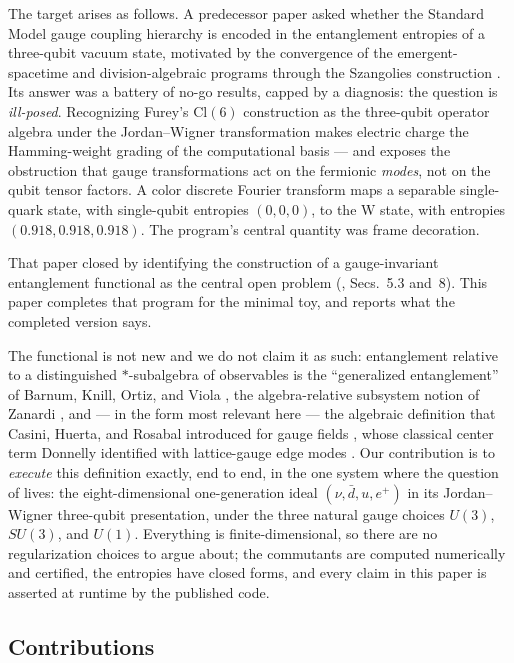 \documentclass[11pt]{article}
\begin{document}
The target arises as follows. A predecessor paper \cite{companion} asked whether the Standard Model gauge coupling hierarchy is encoded in the entanglement entropies of a three-qubit vacuum state, motivated by the convergence of the emergent-spacetime and division-algebraic programs through the Szangolies construction \cite{szangolies}. Its answer was a battery of no-go results, capped by a diagnosis: the question is \emph{ill-posed}. Recognizing Furey's $\mathrm{Cl}(6)$ construction \cite{furey14, furey18, stoica} as the three-qubit operator algebra under the Jordan--Wigner transformation \cite{jordanwigner} makes electric charge the Hamming-weight grading of the computational basis --- and exposes the obstruction that gauge transformations act on the fermionic \emph{modes}, not on the qubit tensor factors. A color discrete Fourier transform maps a separable single-quark state, with single-qubit entropies $(0, 0, 0)$, to the W state, with entropies $(0.918, 0.918, 0.918)$. The program's central quantity was frame decoration.

That paper closed by identifying the construction of a gauge-invariant entanglement functional as the central open problem (\cite{companion}, Secs.~5.3 and~8). This paper completes that program for the minimal toy, and reports what the completed version says.

The functional is not new and we do not claim it as such: entanglement relative to a distinguished $*$-subalgebra of observables is the ``generalized entanglement'' of Barnum, Knill, Ortiz, and Viola \cite{barnum}, the algebra-relative subsystem notion of Zanardi \cite{zanardi}, and --- in the form most relevant here --- the algebraic definition that Casini, Huerta, and Rosabal introduced for gauge fields \cite{chr}, whose classical center term Donnelly identified with lattice-gauge edge modes \cite{donnelly12, donnelly14}. Our contribution is to \emph{execute} this definition exactly, end to end, in the one system where the question of \cite{companion} lives: the eight-dimensional one-generation ideal $(\nu, \bar d, u, e^+)$ in its Jordan--Wigner three-qubit presentation, under the three natural gauge choices $U(3)$, $SU(3)$, and $U(1)$. Everything is finite-dimensional, so there are no regularization choices to argue about; the commutants are computed numerically and certified, the entropies have closed forms, and every claim in this paper is asserted at runtime by the published code.

\subsection{Contributions}
\end{document}
